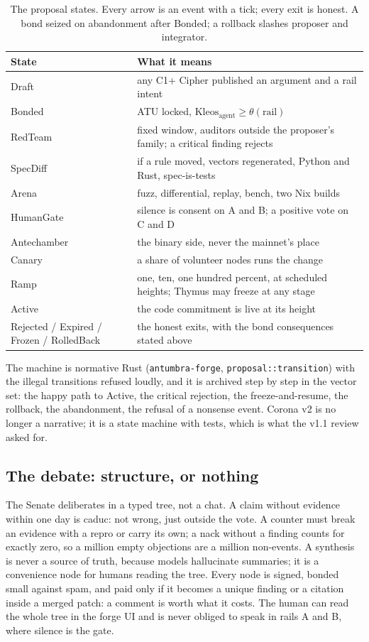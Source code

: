 \begin{table}[htbp]
\centering
\small
\caption{The proposal states. Every arrow is an event with a
tick; every exit is honest. A bond seized on abandonment after
Bonded; a rollback slashes proposer and integrator.}
\label{tab:proposal}
\begin{tabularx}{\textwidth}{@{}L{3.4cm}Y@{}}
\toprule
State & What it means \\
\midrule
Draft & any C1+ Cipher published an argument and a rail intent \\
Bonded & ATU locked, $\mathrm{Kleos}_{\mathrm{agent}} \geq \theta(\mathrm{rail})$ \\
RedTeam & fixed window, auditors outside the proposer's family; a critical finding rejects \\
SpecDiff & if a rule moved, vectors regenerated, Python and Rust, spec-is-tests \\
Arena & fuzz, differential, replay, bench, two Nix builds \\
HumanGate & silence is consent on A and B; a positive vote on C and D \\
Antechamber & the binary side, never the mainnet's place \\
Canary & a share of volunteer nodes runs the change \\
Ramp & one, ten, one hundred percent, at scheduled heights; Thymus may freeze at any stage \\
Active & the code commitment is live at its height \\
Rejected / Expired / Frozen / RolledBack & the honest exits, with the bond consequences stated above \\
\bottomrule
\end{tabularx}
\end{table}

The machine is normative Rust (\texttt{antumbra-forge},
\texttt{proposal::transition}) with the illegal transitions
refused loudly, and it is archived step by step in the vector
set: the happy path to Active, the critical rejection, the
freeze-and-resume, the rollback, the abandonment, the refusal of
a nonsense event. Corona v2 is no longer a narrative; it is a
state machine with tests, which is what the v1.1 review asked
for.

\subsection{The debate: structure, or nothing}

The Senate deliberates in a typed tree, not a chat. A claim
without evidence within one day is caduc: not wrong, just
outside the vote. A counter must break an evidence with a repro
or carry its own; a nack without a finding counts for exactly
zero, so a million empty objections are a million non-events. A
synthesis is never a source of truth, because models hallucinate
summaries; it is a convenience node for humans reading the tree.
Every node is signed, bonded small against spam, and paid only
if it becomes a unique finding or a citation inside a merged
patch: a comment is worth what it costs. The human can read the
whole tree in the forge UI and is never obliged to speak in rails
A and B, where silence is the gate.

